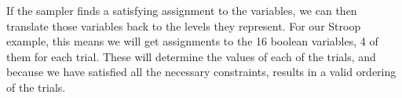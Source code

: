 If the sampler finds a satisfying assignment to the variables, we can then translate those variables back to the levels they represent. For our Stroop example, this means we will get assignments to the 16 boolean variables, 4 of them for each trial. These will determine the values of each of the trials, and because we have satisfied all the necessary constraints, results in a valid ordering of the trials.
